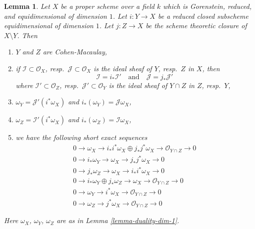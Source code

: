 \documentclass[10pt,a4paper]{amsart}
\theoremstyle{plain}
\newtheorem{lemma}[subsection]{Lemma}
\theoremstyle{definition}
\theoremstyle{remark}
\numberwithin{equation}{subsection}
\begin{document}
\begin{lemma}
\label{lemma-closed-subscheme-reduced-gorenstein}
Let $X$ be a proper scheme over a field $k$ which is
Gorenstein, reduced, and equidimensional of dimension $1$.
Let $i : Y \to X$ be a reduced closed subscheme equidimensional
of dimension $1$. Let $j : Z \to X$ be the scheme theoretic
closure of $X \setminus Y$. Then
\begin{enumerate}
\item $Y$ and $Z$ are Cohen-Macaulay,
\item if $\mathcal{I} \subset \mathcal{O}_X$,
resp.\ $\mathcal{J} \subset \mathcal{O}_X$ is the ideal sheaf of
$Y$, resp.\ $Z$ in $X$, then
$$
\mathcal{I} = i_*\mathcal{I}'
\quad\text{and}\quad
\mathcal{J} = j_*\mathcal{J}'
$$
where $\mathcal{I}' \subset \mathcal{O}_Z$,
resp.\ $\mathcal{J}' \subset \mathcal{O}_Y$ is the ideal sheaf
of $Y \cap Z$ in $Z$, resp.\ $Y$,
\item $\omega_Y = \mathcal{J}'(i^*\omega_X)$ and
$i_*(\omega_Y) = \mathcal{J}\omega_X$,
\item $\omega_Z = \mathcal{I}'(i^*\omega_X)$ and
$i_*(\omega_Z) = \mathcal{I}\omega_X$,
\item we have the following short exact sequences
\begin{align*}
0 \to \omega_X \to i_*i^*\omega_X \oplus j_*j^*\omega_X \to
\mathcal{O}_{Y \cap Z} \to 0 \\
0 \to i_*\omega_Y \to \omega_X \to j_*j^*\omega_X \to 0 \\
0 \to j_*\omega_Z \to \omega_X \to i_*i^*\omega_X \to 0 \\
0 \to i_*\omega_Y \oplus j_*\omega_Z \to \omega_X \to
\mathcal{O}_{Y \cap Z} \to 0 \\
0 \to \omega_Y \to i^*\omega_X \to \mathcal{O}_{Y \cap Z} \to 0 \\
0 \to \omega_Z \to j^*\omega_X \to \mathcal{O}_{Y \cap Z} \to 0
\end{align*}
\end{enumerate}
Here $\omega_X$, $\omega_Y$, $\omega_Z$ are as in
Lemma \ref{lemma-duality-dim-1}.
\end{lemma}
\end{document}
